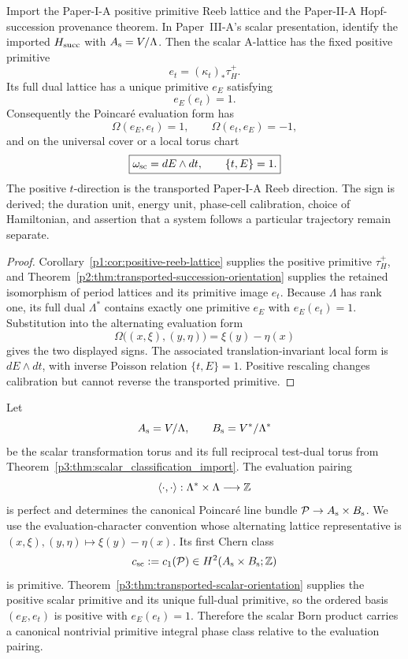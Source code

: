 \documentclass[12pt,a4paper]{article}
\begin{document}
\begin{theorem}
\label{p3:thm:transported-scalar-orientation}
Import the Paper-I-A positive primitive Reeb lattice and the Paper-II-A
Hopf-succession provenance theorem.  In Paper~III-A's scalar presentation,
identify the imported \(H_{\rm succ}\) with \(A_{\rm s}=V/\Lambda\).  Then
the scalar A-lattice has the fixed positive primitive
\[
 e_t=(\kappa_t)_*\tau_H^+.
\]
Its full dual lattice has a unique primitive \(e_E\) satisfying
\[
 \boxed{e_E(e_t)=1.}
\]
Consequently the Poincar\'e evaluation form has
\[
 \Omega(e_E,e_t)=1,
 \qquad
 \Omega(e_t,e_E)=-1,
\]
and on the universal cover or a local torus chart
\[
 \boxed{\omega_{\rm sc}=dE\wedge dt,\qquad\{t,E\}=1.}
\]
The positive \(t\)-direction is the transported Paper-I-A Reeb direction.  The
sign is derived; the duration unit, energy unit, phase-cell calibration,
choice of Hamiltonian, and assertion that a system follows a particular
trajectory remain separate.
\end{theorem}

\begin{proof}
Corollary~\ref{p1:cor:positive-reeb-lattice} supplies the positive primitive
\(\tau_H^+\), and
Theorem~\ref{p2:thm:transported-succession-orientation} supplies the retained
isomorphism of period lattices and its primitive image \(e_t\).  Because
\(\Lambda\) has rank one, its full dual \(\Lambda^*\) contains exactly one
primitive \(e_E\) with \(e_E(e_t)=1\).  Substitution into the alternating
evaluation form
\[
 \Omega\bigl((x,\xi),(y,\eta)\bigr)=\xi(y)-\eta(x)
\]
gives the two displayed signs.  The associated translation-invariant local
form is \(dE\wedge dt\), with inverse Poisson relation
\(\{t,E\}=1\).  Positive rescaling changes calibration but cannot reverse the
transported primitive.
\end{proof}

\begin{theorem}
\label{p3:thm:scalar-born-residue}
Let
\[
        A_{\rm s}=V/\Lambda,
        \qquad
        B_{\rm s}=V^*/\Lambda^*
\]
be the scalar transformation torus and its full reciprocal test-dual torus from
Theorem~\ref{p3:thm:scalar_classification_import}.  The evaluation pairing
\[
        \langle\cdot,\cdot\rangle:
        \Lambda^*\times\Lambda\longrightarrow\mathbb{Z}
\]
is perfect and determines the canonical Poincar\'e line bundle
\(\mathcal P\to A_{\rm s}\times B_{\rm s}\).  We use the
evaluation-character convention whose alternating lattice representative is
\((x,\xi),(y,\eta)\mapsto\xi(y)-\eta(x)\).  Its first Chern class
\[
        c_{\rm sc}:=c_1(\mathcal P)
        \in H^2(A_{\rm s}\times B_{\rm s};\mathbb{Z})
\]
is primitive.  Theorem~\ref{p3:thm:transported-scalar-orientation} supplies
the positive scalar primitive and its unique full-dual primitive, so the
ordered basis \((e_E,e_t)\) is positive with \(e_E(e_t)=1\).
Therefore the scalar Born product carries a canonical nontrivial primitive
integral phase class relative to the evaluation pairing.
\end{theorem}
\end{document}
